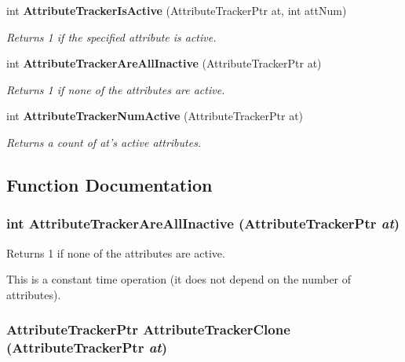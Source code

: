 \begin{CompactItemize}
int {\bf Attribute\-Tracker\-Is\-Active} (Attribute\-Tracker\-Ptr at, int att\-Num)
\begin{CompactList}\small\item\em Returns 1 if the specified attribute is active. \item\end{CompactList}\item 
int {\bf Attribute\-Tracker\-Are\-All\-Inactive} (Attribute\-Tracker\-Ptr at)
\begin{CompactList}\small\item\em Returns 1 if none of the attributes are active. \item\end{CompactList}\item 
int {\bf Attribute\-Tracker\-Num\-Active} (Attribute\-Tracker\-Ptr at)
\begin{CompactList}\small\item\em Returns a count of at's active attributes. \item\end{CompactList}\end{CompactItemize}


\subsection{Function Documentation}
\subsubsection{\setlength{\rightskip}{0pt plus 5cm}int Attribute\-Tracker\-Are\-All\-Inactive (Attribute\-Tracker\-Ptr {\em at})}\label{AttributeTracker_8h_a9}


Returns 1 if none of the attributes are active. 

This is a constant time operation (it does not depend on the number of attributes). 
\subsubsection{\setlength{\rightskip}{0pt plus 5cm}Attribute\-Tracker\-Ptr Attribute\-Tracker\-Clone (Attribute\-Tracker\-Ptr {\em at})}\label{AttributeTracker_8h_a5}


